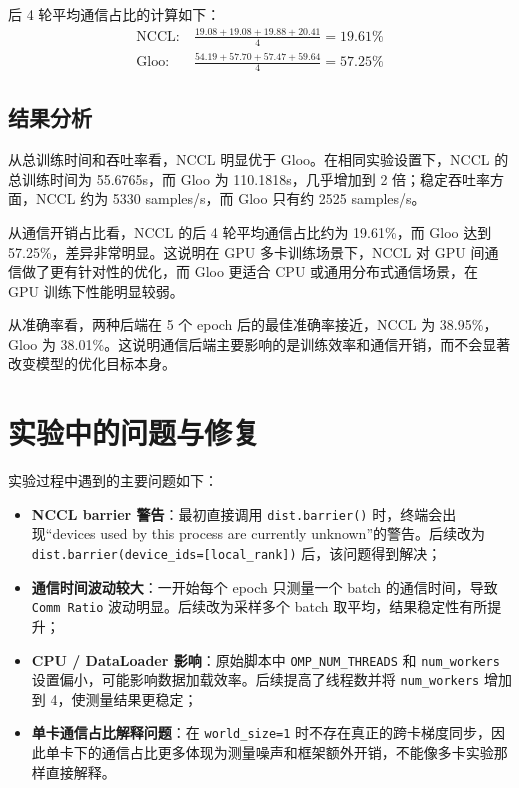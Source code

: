 \documentclass{article}
\begin{document}
后 4 轮平均通信占比的计算如下：
\begin{align*}
  \text{NCCL}:&\ \frac{19.08 + 19.08 + 19.88 + 20.41}{4} = 19.61\% \\
  \text{Gloo}:&\ \frac{54.19 + 57.70 + 57.47 + 59.64}{4} = 57.25\%
\end{align*}

\subsection{结果分析}
从总训练时间和吞吐率看，NCCL 明显优于 Gloo。在相同实验设置下，NCCL 的总训练时间为 55.6765s，而 Gloo 为 110.1818s，几乎增加到 2 倍；稳定吞吐率方面，NCCL 约为 5330 samples/s，而 Gloo 只有约 2525 samples/s。

从通信开销占比看，NCCL 的后 4 轮平均通信占比约为 19.61\%，而 Gloo 达到 57.25\%，差异非常明显。这说明在 GPU 多卡训练场景下，NCCL 对 GPU 间通信做了更有针对性的优化，而 Gloo 更适合 CPU 或通用分布式通信场景，在 GPU 训练下性能明显较弱。

从准确率看，两种后端在 5 个 epoch 后的最佳准确率接近，NCCL 为 38.95\%，Gloo 为 38.01\%。这说明通信后端主要影响的是训练效率和通信开销，而不会显著改变模型的优化目标本身。

\section{实验中的问题与修复}
实验过程中遇到的主要问题如下：
\begin{itemize}
  \item \textbf{NCCL barrier 警告}：最初直接调用 \texttt{dist.barrier()} 时，终端会出现“devices used by this process are currently unknown”的警告。后续改为 \texttt{dist.barrier(device\_ids=[local\_rank])} 后，该问题得到解决；
  \item \textbf{通信时间波动较大}：一开始每个 epoch 只测量一个 batch 的通信时间，导致 \texttt{Comm Ratio} 波动明显。后续改为采样多个 batch 取平均，结果稳定性有所提升；
  \item \textbf{CPU / DataLoader 影响}：原始脚本中 \texttt{OMP\_NUM\_THREADS} 和 \texttt{num\_workers} 设置偏小，可能影响数据加载效率。后续提高了线程数并将 \texttt{num\_workers} 增加到 4，使测量结果更稳定；
  \item \textbf{单卡通信占比解释问题}：在 \texttt{world\_size=1} 时不存在真正的跨卡梯度同步，因此单卡下的通信占比更多体现为测量噪声和框架额外开销，不能像多卡实验那样直接解释。
\end{itemize}
\end{document}
